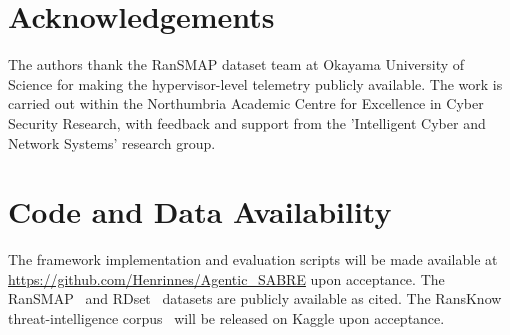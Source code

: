 \documentclass[journal]{IEEEtran}
\begin{document}
\section*{Acknowledgements}
The authors thank the RanSMAP dataset team at Okayama University of
Science for making the hypervisor-level telemetry publicly available. The work is carried out within the Northumbria Academic Centre for Excellence in Cyber Security Research, with feedback and support from the 'Intelligent Cyber and Network Systems' research group.

\section*{Code and Data Availability}
The framework implementation and evaluation scripts will be made available at
\url{https://github.com/Henrinnes/Agentic_SABRE} upon acceptance.
The RanSMAP~\cite{hirano2025ransmap} and RDset~\cite{kabuye2025explainable}
datasets are publicly available as cited.
The RansKnow threat-intelligence corpus~\cite{ransknow_2026} will be
released on Kaggle upon acceptance.



\end{document}
